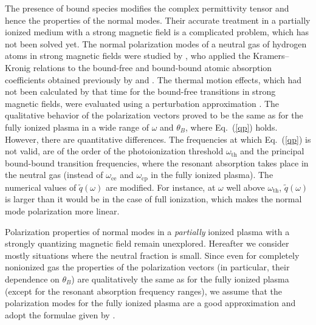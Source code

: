 \documentclass{emulateapj}
\newcommand{\req}[1]{Eq.\ (\ref{#1})}
\newcommand{\omc}{\omega_\mathrm{ce}}
\newcommand{\omp}{\omega_\mathrm{cp}}
\begin{document}
The presence of bound species modifies the complex permittivity tensor 
and hence the properties of the normal modes. Their accurate treatment
in a partially ionized medium with a strong magnetic field
 is a complicated problem, which has not been solved yet. The
 normal polarization modes of a neutral gas of hydrogen atoms
 in strong magnetic fields
 were studied
 by \citet{BulikPavlov},
 who applied the Kramers--Kronig relations 
 to the bound-free and bound-bound
 atomic absorption coefficients
 obtained previously by \citet{PP93} 
 and \citet{PP95}.
 The thermal motion effects, which had not been calculated by that time
 for the bound-free transitions in strong magnetic fields, 
 were evaluated using a perturbation approximation \citep{PM93}.
The qualitative behavior of the polarization vectors
 proved to be the same as for the fully ionized plasma
 in a wide range of $\omega$ and $\theta_B$,
 where \req{qp} holds.
 However, there are quantitative differences.
 The frequencies at which \req{qp} is not valid,
 are of the order of the photoionization threshold $\omega_\mathrm{th}$
 and the principal bound-bound transition frequencies,
 where the resonant absorption takes place in the neutral gas
 (instead of $\omc$ and $\omp$ in the fully
 ionized plasma).
 The numerical values of $\tilde{q}(\omega)$ 
 are modified. 
 For instance, at $\omega$ well above  $\omega_\mathrm{th}$, 
 $\tilde{q}(\omega)$ is larger
 than it would be in the case of full ionization,
 which makes the normal mode polarization more linear.
 
Polarization properties of normal modes in a 
\emph{partially} ionized plasma with a strongly quantizing
magnetic field remain unexplored.
 Hereafter we consider mostly situations
 where the neutral fraction is small.
 Since even for completely nonionized gas 
 the properties of the polarization vectors (in particular,
 their dependence on $\theta_B$) are qualitatively the same
 as for the fully ionized plasma 
 (except for the resonant absorption frequency ranges),
 we assume that the polarization modes for the fully
 ionized plasma are a good approximation
 and adopt the formulae given by \citet{HoLai02}.
\end{document}
